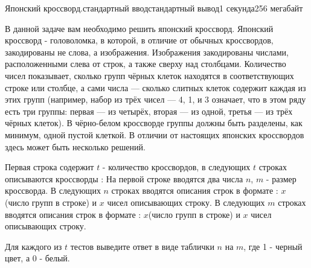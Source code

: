 \begin{problem}{Японский кроссворд.}{стандартный ввод}{стандартный вывод}{1 секунда}{256 мегабайт}

В данной задаче вам необходимо решить японский кроссворд. Японский кроссворд - головоломка, в которой, в отличие от обычных кроссвордов, закодированы не слова, а изображения. Изображения закодированы числами, расположенными слева от строк, а также сверху над столбцами. Количество чисел показывает, сколько групп чёрных клеток находятся в соответствующих строке или столбце, а сами числа --- сколько слитных клеток содержит каждая из этих групп (например, набор из трёх чисел --- 4, 1, и 3 означает, что в этом ряду есть три группы: первая --- из четырёх, вторая --- из одной, третья --- из трёх чёрных клеток). В чёрно-белом кроссворде группы должны быть разделены, как минимум, одной пустой клеткой. В отличии от настоящих японских кроссвордов здесь может быть несколько решений.

\InputFile
Первая строка содержит $t$ - количество кроссвордов, в следующих $t$ строках описываются кроссворды :  
На первой строке вводятся два числа $n$, $m$ - размер кроссворда. 
В следующих $n$ строках вводятся описания строк в формате : $x$(число групп в строке) и $x$ чисел описывающих строку.
В следующих $m$ строках вводятся описания строк в формате : $x$(число групп в строке) и $x$ чисел описывающих строку.

\OutputFile
Для каждого из $t$ тестов выведите ответ в виде таблички $n$ на $m$, где 1 - черный цвет, а 0 - белый.

\Example

\begin{example}
%
\end{example}


\end{problem}
